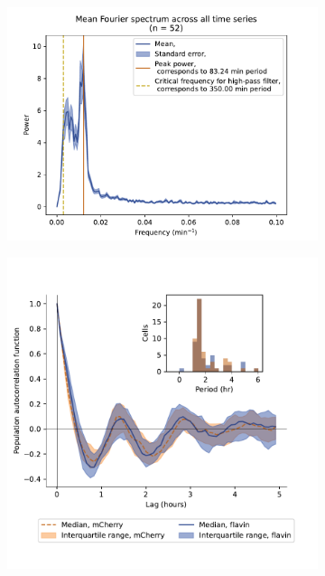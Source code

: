 \begin{figure}[b!]
  \begin{subfigure}[htpb]{0.45\textwidth}
   \centering
   \includegraphics[width=\textwidth]{htb2mCherry_27917_14}
   \caption{
   }
   \label{fig:biology-highglc-sync-fourier-2}
  \end{subfigure}%
  \begin{subfigure}[htpb]{0.45\textwidth}
   \centering
   \includegraphics[width=\textwidth]{htb2mCherry_27917_12}
   \caption{
   }
   \label{fig:biology-highglc-sync-acf-2}
  \end{subfigure}


\end{figure}
